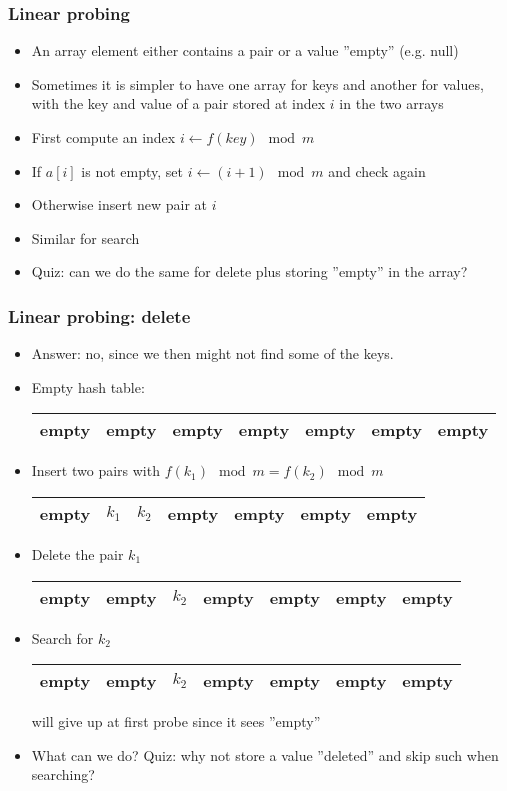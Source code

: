 \documentclass[trans]{beamer}
\begin{document}
\begin{frame}[fragile=singleslide]
\frametitle{Linear probing}
\begin{itemize}
\item An array element either contains a pair or a value ''empty'' (e.g. null)
\item Sometimes it is simpler to have one array for keys and another for values, with the key and value of a pair 
stored at index $i$ in the two arrays
\item First compute an index $i \leftarrow f(key) \mod m$
\item If $a[i]$ is not empty, set $i \leftarrow (i + 1)\mod m$ and check again
\item Otherwise insert new pair at $i$
\item Similar for search
\item Quiz: can we do the same for delete plus storing ''empty'' in the array?
\end{itemize}
\end{frame}

\begin{frame}[fragile=singleslide]
\frametitle{Linear probing: delete}
\begin{itemize}
\item Answer: no, since we then might not find some of the keys.
\item Empty hash table:
\begin{tabular}{|p{1cm}|p{1cm}|p{1cm}|p{1cm}|p{1cm}|p{1cm}|p{1cm}|}
\hline 
empty & empty & empty & empty & empty & empty & empty \\
\hline 
\end{tabular}

\item Insert two pairs with $f(k_1) \mod m = f(k_2) \mod m$
\begin{tabular}{|p{1cm}|p{1cm}|p{1cm}|p{1cm}|p{1cm}|p{1cm}|p{1cm}|}
\hline 
empty & $k_1$ & $k_2$ & empty & empty & empty & empty \\
\hline 
\end{tabular}
\item Delete the pair $k_1$
\begin{tabular}{|p{1cm}|p{1cm}|p{1cm}|p{1cm}|p{1cm}|p{1cm}|p{1cm}|}
\hline 
empty & empty & $k_2$ & empty & empty & empty & empty \\
\hline 
\end{tabular}
\item Search for $k_2$
\begin{tabular}{|p{1cm}|p{1cm}|p{1cm}|p{1cm}|p{1cm}|p{1cm}|p{1cm}|}
\hline 
empty & empty & $k_2$ & empty & empty & empty & empty \\
\hline 
\end{tabular}

will give up at first probe since it sees ''empty''
\item What can we do? Quiz: why not store a value ''deleted'' and skip such when searching?
\end{itemize}
\end{frame}
\end{document}
